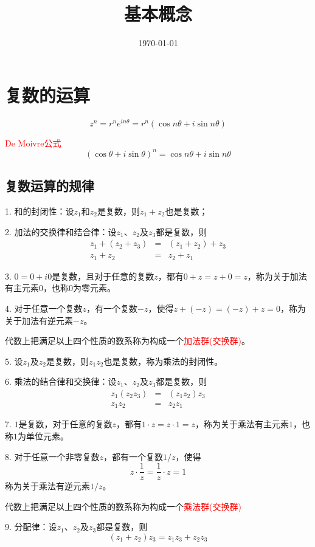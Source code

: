 \documentclass[12pt,a4paper]{article}
\title{基本概念}
\author{}
\date{\today}
\begin{document}
\maketitle




\section{复数的运算}
\begin{equation}
z^n = r^n e^{in\theta} = r^n (\cos n\theta +i\sin n\theta)
\end{equation}

\textcolor{red}{De Moivre公式}
\begin{equation}
(\cos \theta +i \sin \theta)^n = \cos n\theta +i \sin n\theta
\end{equation}


\subsection{复数运算的规律}
1. 和的封闭性：设$z_1$和$z_2$是复数，则$z_1 +z_2$也是复数；

2. 加法的交换律和结合律：设$z_1$、$z_2$及$z_3$都是复数，则
\begin{eqnarray}
\nonumber z_1 +(z_2 +z_3) &=& (z_1 +z_2) +z_3 \\
z_1 + z_2 &=& z_2 + z_1
\end{eqnarray}

3. $0 = 0 +i0$是复数，且对于任意的复数$z$，都有$0+z = z+0 = z$，称为关于加法有主元素$0$，也称$0$为零元素。

4. 对于任意一个复数$z$，有一个复数$-z$，使得$z+(-z) = (-z) + z = 0$，称为关于加法有逆元素$-z$。

代数上把满足以上四个性质的数系称为构成一个\textcolor{red}{加法群(交换群)}。

5. 设$z_1$及$z_2$是复数，则$z_1z_2$也是复数，称为乘法的封闭性。

6. 乘法的结合律和交换律：设$z_1$、$z_2$及$z_3$都是复数，则
\begin{eqnarray}
\nonumber z_1(z_2z_3) &=& (z_1z_2)z_3 \\
z_1z_2 &=& z_2z_1
\end{eqnarray}

7. $1$是复数，对于任意的复数$z$，都有$1\cdot z = z\cdot 1 = z$，称为关于乘法有主元素$1$，也称$1$为单位元素。

8. 对于任意一个非零复数$z$，都有一个复数$1/z$，使得
\begin{equation}
z\cdot \frac{1}{z} = \frac{1}{z} \cdot z = 1
\end{equation}
称为关于乘法有逆元素$1/z$。

代数上把满足以上四个性质的数系称为构成一个\textcolor{red}{乘法群(交换群)}

9. 分配律：设$z_1$、$z_2$及$z_3$都是复数，则
\begin{equation}
(z_1 +z_2)z_3 = z_1z_3 +z_2z_3
\end{equation}
\end{document}
